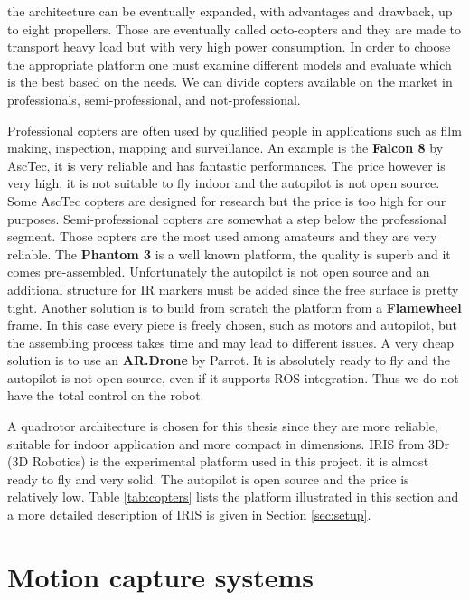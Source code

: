 the architecture can be eventually expanded, with advantages and drawback, up to eight propellers. Those are eventually called octo-copters and they are made to transport heavy load but with very high power consumption. In order to choose the appropriate platform one must examine different models and evaluate which is the best based on the needs. We can divide copters available on the market in professionals, semi-professional, and not-professional.\par Professional copters are often used by qualified people in applications such as film making, inspection, mapping and surveillance. An example is the\textbf{ Falcon 8} by AscTec, it is very reliable and has fantastic performances. The price however is very high, it is not suitable to fly indoor and the autopilot is not open source. Some AscTec copters are designed for research but the price is too high for our purposes. Semi-professional copters are somewhat a step below the professional segment. Those copters are the most used among amateurs and they are very reliable. The \textbf{Phantom 3} is a well known platform, the quality is superb and it comes pre-assembled. Unfortunately the autopilot is not open source and an additional structure for IR markers must be added since the free surface is pretty tight. Another solution is to build from scratch the platform from a \textbf{Flamewheel} frame. In this case every piece is freely chosen, such as motors and autopilot, but the assembling process takes time and may lead to different issues. A very cheap solution is to use an \textbf{AR.Drone} by Parrot. It is absolutely ready to fly and the autopilot is not open source, even if it supports ROS integration. Thus we do not have the total control on the robot.
\par A quadrotor architecture is chosen for this thesis since they are more reliable, suitable for indoor application and more compact in  dimensions. IRIS from 3Dr (3D Robotics) is the experimental platform used in this project, it is almost ready to fly and very solid. The autopilot is open source and the price is relatively low. Table \ref{tab:copters} lists the platform illustrated in this section and a more detailed description of IRIS is given in Section \ref{sec:setup}.

\section{Motion capture systems}


